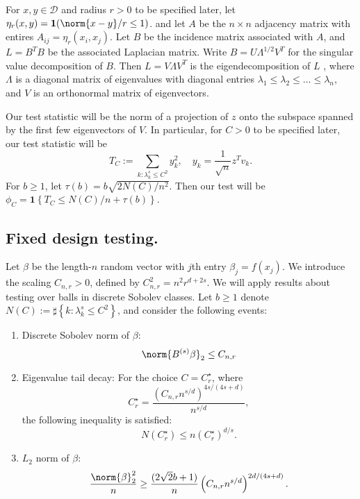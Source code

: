 \documentclass{article}
\newcommand{\set}[1]{\left\{#1\right\}}
\newcommand{\1}{\mathbb{I}}
\theoremstyle{alden}
\theoremstyle{aldenthm}
\theoremstyle{definition}
\theoremstyle{remark}
\begin{document}
For $x,y \in \mathcal{D}$ and radius $r > 0$ to be specified later, let $\eta_r(x,y) = \mathbf{1}(\norm{x - y}/ r \leq 1)$. and let $A$ be the $n \times n$ adjacency matrix with entires $A_{ij} = \eta_r(x_i,x_j)$. Let $B$ be the incidence matrix associated with $A$, and $L = B^TB$ be the associated Laplacian matrix. Write $B = U \Lambda^{1/2}V^T$ for the singular value decomposition of $B$. Then $L = V \Lambda V^T$ is the eigendecomposition of $L$ , where $\Lambda$ is a diagonal matrix of eigenvalues with diagonal entries $\lambda_1 \leq \lambda_2 \leq \ldots \leq \lambda_n$, and $V$ is an orthonormal matrix of eigenvectors. 

Our test statistic will be the norm of a projection of $z$ onto the subspace spanned by the first few eigenvectors of $V$. In particular, for $C > 0$ to be specified later, our test statistic will be
\begin{equation*}
T_C := \sum_{k: \lambda_k^s \leq C^2} y_k^2, \quad y_k = \frac{1}{\sqrt{n}} z^T v_k.
\end{equation*}
For $b \geq 1$, let $\tau(b) = b\sqrt{2N(C)/n^2}$. Then our test will be $\phi_{C} = \mathbf{1}\set{T_C \leq N(C)/n + \tau(b)}$.

\subsection{Fixed design testing.}

Let $\beta$ be the length-$n$ random vector with $j$th entry $\beta_j = f(x_j)$. We introduce the scaling $C_{n,r} > 0$, defined by $C_{n,r}^2 = n^2r^{d + 2s}$.  We will apply results about testing over balls in discrete Sobolev classes. Let $b \geq 1$ denote $N(C) := \sharp\set{k: \lambda_k^s \leq C^2}$, and consider the following events:
\begin{enumerate}[label=(E\arabic*)]
	\item 
	\label{event:discrete_sobolev_norm}
	Discrete Sobolev norm of $\beta$:
	\begin{equation*}
	\norm{B^{(s)}\beta}_2 \leq C_{n,r}
	\end{equation*}
	\item Eigenvalue tail decay:
	\label{event:tail_decay}
	For the choice $C = C_r^{\star}$, where
	\begin{equation*}
	C_r^{\star} = \frac{(C_{n,r}n^{s/d})^{4s/(4s + d)}}{n^{s/d}},
	\end{equation*}
	the following inequality is satisfied:
	\begin{equation*}
	N(C_r^{\star}) \leq n(C_r^{\star})^{d/s}.
	\end{equation*}
	\item 
	\label{event:l2_norm}
	$L_2$ norm of $\beta$:
	\begin{equation*}
	\frac{\norm{\beta}_2^2}{n} \geq \frac{(2\sqrt{2}b + 1)}{n} \left(C_{n,r}n^{s/d}\right)^{2d/(4s+d)}.
	\end{equation*}
\end{enumerate}
\end{document}
